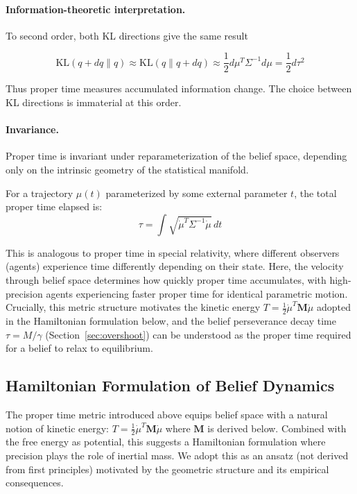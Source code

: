 \documentclass[12pt]{article}
\begin{document}
\paragraph{Information-theoretic interpretation.} To second order, both KL directions give the same result

\begin{equation}
\text{KL}(q + dq \| q) \approx \text{KL}(q \| q + dq) \approx \frac{1}{2} d\mu^T \Sigma^{-1} d\mu = \frac{1}{2} d\tau^2
\end{equation}

Thus proper time measures accumulated information change. The choice between KL directions is immaterial at this order.

\paragraph{Invariance.} Proper time is invariant under reparameterization of the belief space, depending only on the intrinsic geometry of the statistical manifold.

For a trajectory $\mu(t)$ parameterized by some external parameter $t$, the total proper time elapsed is:
\begin{equation}
\tau = \int \sqrt{\dot{\mu}^T \Sigma^{-1} \dot{\mu}} \, dt
\end{equation}

This is analogous to proper time in special relativity, where different observers (agents) experience time differently depending on their state. Here, the velocity through belief space determines how quickly proper time accumulates, with high-precision agents experiencing faster proper time for identical parametric motion. Crucially, this metric structure motivates the kinetic energy $T = \frac{1}{2}\dot{\mu}^T \mathbf{M} \dot{\mu}$ adopted in the Hamiltonian formulation below, and the belief perseverance decay time $\tau = M/\gamma$ (Section~\ref{sec:overshoot}) can be understood as the proper time required for a belief to relax to equilibrium.

\subsection{Hamiltonian Formulation of Belief Dynamics}
\label{sec:hamiltonian}

The proper time metric introduced above equips belief space with a natural notion of kinetic energy: $T = \frac{1}{2}\dot{\mu}^T \mathbf{M} \dot{\mu}$ where $\mathbf{M}$ is derived below. Combined with the free energy as potential, this suggests a Hamiltonian formulation where precision plays the role of inertial mass. We adopt this as an ansatz (not derived from first principles) motivated by the geometric structure and its empirical consequences.
\end{document}
